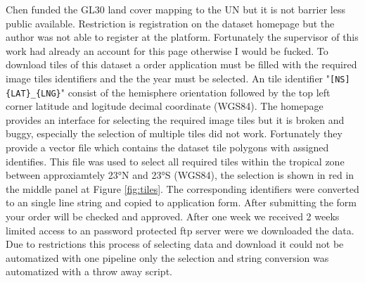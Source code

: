 			Chen funded the \ac{GL30} land cover mapping to the UN but it is not barrier less public available. Restriction is registration on the dataset homepage but the author was not able to register at the platform. Fortunately the supervisor of this work had already an account for this page otherwise I would be fucked. To download tiles of this dataset a order application must be filled with the required image tiles identifiers and the the year must be selected. An tile identifier "\verb|[NS]{LAT}_{LNG}|" consist of the hemisphere orientation followed by the top left corner latitude and logitude decimal coordinate (\ac{WGS84}). The homepage provides an interface for selecting the required image tiles but it is broken and buggy, especially the selection of multiple tiles did not work. Fortunately they provide a vector file which contains the dataset tile polygons with assigned identifies. This file was used to select all required tiles within the tropical zone between approxiamtely 23°N and 23°S (\ac{WGS84}), the selection is shown in red in the middle panel at Figure \ref{fig:tiles}. The corresponding identifiers were converted to an single line string and copied to application form. After submitting the form your order will be checked and approved. After one week we received 2 weeks limited access to an password protected ftp server were we downloaded the data. Due to restrictions this process of selecting data and download it could not be automatized with one pipeline only the selection and string conversion was automatized with a throw away script.

